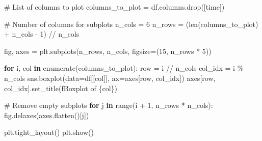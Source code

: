\documentclass[
  letterpaper,
  DIV=11,
  numbers=noendperiod]{scrartcl}
\newenvironment{Shaded}{\begin{snugshade}}{\end{snugshade}}
\newcommand{\BuiltInTok}[1]{\textcolor[rgb]{0.00,0.23,0.31}{#1}}
\newcommand{\CommentTok}[1]{\textcolor[rgb]{0.37,0.37,0.37}{#1}}
\newcommand{\ControlFlowTok}[1]{\textcolor[rgb]{0.00,0.23,0.31}{\textbf{#1}}}
\newcommand{\DecValTok}[1]{\textcolor[rgb]{0.68,0.00,0.00}{#1}}
\newcommand{\KeywordTok}[1]{\textcolor[rgb]{0.00,0.23,0.31}{\textbf{#1}}}
\newcommand{\NormalTok}[1]{\textcolor[rgb]{0.00,0.23,0.31}{#1}}
\newcommand{\OperatorTok}[1]{\textcolor[rgb]{0.37,0.37,0.37}{#1}}
\newcommand{\SpecialCharTok}[1]{\textcolor[rgb]{0.37,0.37,0.37}{#1}}
\newcommand{\SpecialStringTok}[1]{\textcolor[rgb]{0.13,0.47,0.30}{#1}}
\newcommand{\StringTok}[1]{\textcolor[rgb]{0.13,0.47,0.30}{#1}}
\begin{document}
\begin{Shaded}
\begin{Highlighting}[]
\CommentTok{\# List of columns to plot}
\NormalTok{columns\_to\_plot }\OperatorTok{=}\NormalTok{ df.columns.drop([}\StringTok{\textquotesingle{}time\textquotesingle{}}\NormalTok{])}

\CommentTok{\# Number of columns for subplots}
\NormalTok{n\_cols }\OperatorTok{=} \DecValTok{6}
\NormalTok{n\_rows }\OperatorTok{=}\NormalTok{ (}\BuiltInTok{len}\NormalTok{(columns\_to\_plot) }\OperatorTok{+}\NormalTok{ n\_cols }\OperatorTok{{-}} \DecValTok{1}\NormalTok{) }\OperatorTok{//}\NormalTok{ n\_cols}

\NormalTok{fig, axes }\OperatorTok{=}\NormalTok{ plt.subplots(n\_rows, n\_cols, figsize}\OperatorTok{=}\NormalTok{(}\DecValTok{15}\NormalTok{, n\_rows }\OperatorTok{*} \DecValTok{5}\NormalTok{))}

\ControlFlowTok{for}\NormalTok{ i, col }\KeywordTok{in} \BuiltInTok{enumerate}\NormalTok{(columns\_to\_plot):}
\NormalTok{    row }\OperatorTok{=}\NormalTok{ i }\OperatorTok{//}\NormalTok{ n\_cols}
\NormalTok{    col\_idx }\OperatorTok{=}\NormalTok{ i }\OperatorTok{\%}\NormalTok{ n\_cols}
\NormalTok{    sns.boxplot(data}\OperatorTok{=}\NormalTok{df[[col]], ax}\OperatorTok{=}\NormalTok{axes[row, col\_idx])}
\NormalTok{    axes[row, col\_idx].set\_title(}\SpecialStringTok{f\textquotesingle{}Boxplot of }\SpecialCharTok{\{}\NormalTok{col}\SpecialCharTok{\}}\SpecialStringTok{\textquotesingle{}}\NormalTok{)}

\CommentTok{\# Remove empty subplots}
\ControlFlowTok{for}\NormalTok{ j }\KeywordTok{in} \BuiltInTok{range}\NormalTok{(i }\OperatorTok{+} \DecValTok{1}\NormalTok{, n\_rows }\OperatorTok{*}\NormalTok{ n\_cols):}
\NormalTok{    fig.delaxes(axes.flatten()[j])}

\NormalTok{plt.tight\_layout()}
\NormalTok{plt.show()}
\end{Highlighting}
\end{Shaded}
\end{document}
